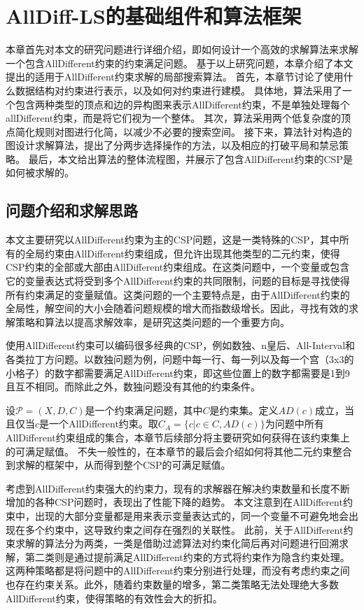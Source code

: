\chapter{AllDiff-LS的基础组件和算法框架}\label{chap:method}
本章首先对本文的研究问题进行详细介绍，即如何设计一个高效的求解算法来求解一个包含AllDifferent约束的约束满足问题。
基于以上研究问题，本章介绍了本文提出的适用于AllDifferent约束求解的局部搜索算法。
首先，本章节讨论了使用什么数据结构对约束进行表示，以及如何对约束进行建模。
具体地，算法采用了一个包含两种类型的顶点和边的异构图来表示AllDifferent约束，不是单独处理每个allDifferent约束，而是将它们视为一个整体。
其次，算法采用两个低复杂度的顶点简化规则对图进行化简，以减少不必要的搜索空间。
接下来，算法针对构造的图设计求解算法，提出了分两步选择操作的方法，以及相应的打破平局和禁忌策略。
最后，本文给出算法的整体流程图，并展示了包含AllDifferent约束的CSP是如何被求解的。

\section{问题介绍和求解思路}

本文主要研究以AllDifferent约束为主的CSP问题，这是一类特殊的CSP，其中所有的全局约束由AllDifferent约束组成，但允许出现其他类型的二元约束，使得CSP约束的全部或大部由AllDifferent约束组成。在这类问题中，一个变量或包含它的变量表达式将受到多个AllDifferent约束的共同限制，问题的目标是寻找使得所有约束满足的变量赋值。这类问题的一个主要特点是，由于AllDifferent约束的全局性，解空间的大小会随着问题规模的增大而指数级增长。因此，寻找有效的求解策略和算法以提高求解效率，是研究这类问题的一个重要方向。

使用AllDifferent约束可以编码很多经典的CSP，例如数独、n皇后、All-Interval和各类拉丁方问题。以数独问题为例，问题中每一行、每一列以及每一个宫（3x3的小格子）的数字都需要满足AllDifferent约束，即这些位置上的数字都需要是1到9且互不相同。而除此之外，数独问题没有其他的约束条件。

设$\mathcal{P} = (X, D, C)$是一个约束满足问题，其中$C$是约束集。定义$AD(c)$成立，当且仅当$c$是一个AllDifferent约束。取$C_A = \{c |c \in C, AD(c)\}$为问题中所有AllDifferent约束组成的集合，本章节后续部分将主要研究如何获得在该约束集上的可满足赋值。
不失一般性的，在本章节的最后会介绍如何将其他二元约束整合到求解的框架中，从而得到整个CSP的可满足赋值。

考虑到AllDifferent约束强大的约束力，现有的求解器在解决约束数量和长度不断增加的各种CSP问题时，表现出了性能下降的趋势。
本文注意到在AllDifferent约束中，出现的大部分变量都是用来表示变量表达式的，同一个变量不可避免地会出现在多个约束中，这导致约束之间存在强烈的关联性。
此前，关于AllDifferent约束求解的算法分为两类，一类是借助过滤算法对约束化简后再对问题进行回溯求解，第二类则是通过提前满足AllDifferent约束的方式将约束作为隐含约束处理。
这两种策略都是将问题中的AllDifferent约束分别进行处理，而没有考虑约束之间也存在约束关系。此外，随着约束数量的增多，第二类策略无法处理绝大多数AllDifferent约束，使得策略的有效性会大的折扣。

